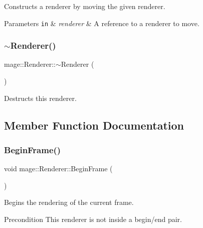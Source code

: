 Constructs a renderer by moving the given renderer.


\begin{DoxyParams}[1]{Parameters}
\mbox{\tt in}  & {\em renderer} & A reference to a renderer to move. \\
\hline
\end{DoxyParams}
\hypertarget{classmage_1_1_renderer_a997e041f28cc71d069d1ab7d29fe6ced}{}\label{classmage_1_1_renderer_a997e041f28cc71d069d1ab7d29fe6ced} 
\subsubsection{\texorpdfstring{$\sim$\+Renderer()}{~Renderer()}}
{\footnotesize\ttfamily mage\+::\+Renderer\+::$\sim$\+Renderer (\begin{DoxyParamCaption}{ }\end{DoxyParamCaption})}

Destructs this renderer. 

\subsection{Member Function Documentation}
\hypertarget{classmage_1_1_renderer_ac9adf3be8c7201e4df8c5f9e049dc43d}{}\label{classmage_1_1_renderer_ac9adf3be8c7201e4df8c5f9e049dc43d} 
\subsubsection{\texorpdfstring{Begin\+Frame()}{BeginFrame()}}
{\footnotesize\ttfamily void mage\+::\+Renderer\+::\+Begin\+Frame (\begin{DoxyParamCaption}{ }\end{DoxyParamCaption})}

Begins the rendering of the current frame.

\begin{DoxyPrecond}{Precondition}
This renderer is not inside a begin/end pair. 
\end{DoxyPrecond}
\hypertarget{classmage_1_1_renderer_a2ffbc529a9f57ebd724273bbf17413fc}{}\label{classmage_1_1_renderer_a2ffbc529a9f57ebd724273bbf17413fc} 
